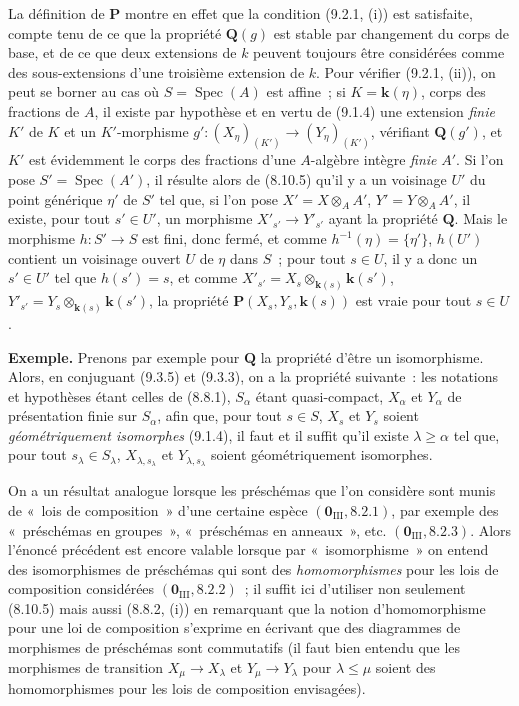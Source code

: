 La définition de $\boldsymbol{P}$ montre en effet que la condition (9.2.1, (i))
est satisfaite, compte tenu de ce que la propriété $\boldsymbol{Q}(g)$ est stable
par changement du corps de base, et de ce que deux extensions de $k$ peuvent
toujours être considérées comme des sous-extensions d'une troisième extension
de $k$. Pour vérifier (9.2.1, (ii)), on peut se borner au cas où
$S=\operatorname{Spec}(A)$ est affine~; si $K=\boldsymbol{k}(\eta)$, corps des fractions de
$A$, il existe par hypothèse et en vertu de (9.1.4) une extension \emph{finie} $K'$ de
$K$ et un $K'$-morphisme
$g':(X_\eta)_{(K')}\to(Y_\eta)_{(K')}$, vérifiant $\boldsymbol{Q}(g')$, et $K'$ est
évidemment le corps des fractions d'une $A$-algèbre intègre \emph{finie} $A'$. Si
l'on pose $S'=\operatorname{Spec}(A')$, il résulte alors de (8.10.5) qu'il y
a un voisinage $U'$ du point générique $\eta'$ de $S'$ tel que, si l'on pose
$X'=X\otimes_A A'$, $Y'=Y\otimes_A A'$, il existe, pour tout $s'\in U'$, un
morphisme $X'_{s'}\to Y'_{s'}$ ayant la propriété $\boldsymbol{Q}$. Mais le
morphisme $h:S'\to S$ est fini, donc fermé, et comme
$h^{-1}(\eta)=\{\eta'\}$, $h(U')$ contient un voisinage ouvert $U$ de $\eta$
dans $S$~; pour tout $s\in U$, il y a donc un $s'\in U'$ tel que $h(s')=s$,
et comme
$X'_{s'}=X_s\otimes_{\mathbf{k}(s)}\boldsymbol{k}(s')$,
$Y'_{s'}=Y_s\otimes_{\mathbf{k}(s)}\boldsymbol{k}(s')$, la propriété
$\boldsymbol{P}(X_s,Y_s,\boldsymbol{k}(s))$ est vraie pour tout $s\in U$.

\begin{env}[9.3.6]
\label{IV.9.3.6-fr}
\textbf{Exemple.} Prenons par exemple pour $\boldsymbol{Q}$ la propriété d'être un
isomorphisme. Alors, en conjuguant (9.3.5) et (9.3.3), on a la propriété
suivante~: les notations et hypothèses étant celles de (8.8.1), $S_\alpha$
étant quasi-compact, $X_\alpha$ et $Y_\alpha$ de présentation finie sur
$S_\alpha$, afin que, pour tout $s\in S$, $X_s$ et $Y_s$ soient
\emph{géométriquement isomorphes} (9.1.4), il faut et il suffit qu'il existe
$\lambda\geqslant\alpha$ tel que, pour tout $s_\lambda\in S_\lambda$,
$X_{\lambda,s_\lambda}$ et $Y_{\lambda,s_\lambda}$ soient géométriquement
isomorphes.
\end{env}

On a un résultat analogue lorsque les préschémas que l'on considère sont munis
de «~lois de composition~» d'une certaine espèce
$(\mathbf 0_{\mathrm{III}},8.2.1)$, par exemple des «~préschémas en groupes~»,
«~préschémas en anneaux~», etc. $(\mathbf 0_{\mathrm{III}},8.2.3)$. Alors
l'énoncé précédent est encore valable lorsque par «~isomorphisme~» on entend
des isomorphismes de préschémas qui sont des \emph{homomorphismes} pour les lois de
composition considérées $(\mathbf 0_{\mathrm{III}},8.2.2)$~; il suffit ici
d'utiliser non seulement (8.10.5) mais aussi (8.8.2, (i)) en remarquant que la
notion d'homomorphisme pour une loi de composition s'exprime en écrivant que
des diagrammes de morphismes de préschémas sont commutatifs (il faut bien
entendu que les morphismes de transition $X_\mu\to X_\lambda$ et
$Y_\mu\to Y_\lambda$ pour $\lambda\leqslant\mu$ soient des homomorphismes
pour les lois de composition envisagées).

